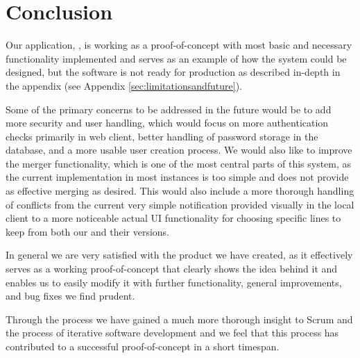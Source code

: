 \section{Conclusion}
Our application, \SOP{}, is working as a proof-of-concept with most basic and necessary functionality implemented and serves as an example of how the system could be designed, but the software is not ready for production as described in-depth in the appendix (see Appendix \ref{sec:limitationsandfuture}).

Some of the primary concerns to be addressed in the future would be to add more security and user handling, which would focus on more authentication checks primarily in web client, better handling of password storage in the database, and a more usable user creation process. We would also like to improve the merger functionality, which is one of the most central parts of this system, as the current implementation in most instances is too simple and does not provide as effective merging as desired. This would also include a more thorough handling of conflicts from the current very simple notification provided visually in the local client to a more noticeable actual UI functionality for choosing specific lines to keep from both our and their versions.

In general we are very satisfied with the product we have created, as it effectively serves as a working proof-of-concept that clearly shows the idea behind it and enables us to easily modify it with further functionality, general improvements, and bug fixes we find prudent.

Through the process we have gained a much more thorough insight to Scrum and the process of iterative software development and we feel that this process has contributed to a successful proof-of-concept in a short timespan.
